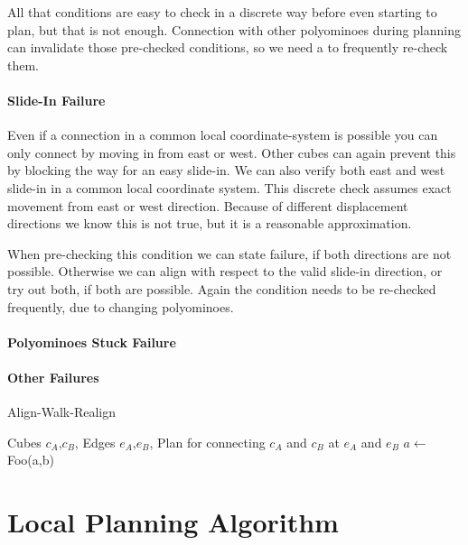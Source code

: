 All that conditions are easy to check in a discrete way before even starting to plan, but that is not enough.
Connection with other polyominoes during planning can invalidate those pre-checked conditions, so we need a to frequently re-check them.

\paragraph{Slide-In Failure}

Even if a connection in a common local coordinate-system is possible you can only connect by moving in from east or west.
Other cubes can again prevent this by blocking the way for an easy slide-in.
We can also verify both east and west slide-in in a common local coordinate system.
This discrete check assumes exact movement from east or west direction.
Because of different displacement directions we know this is not true, but it is a reasonable approximation.

When pre-checking this condition we can state failure, if both directions are not possible.
Otherwise we can align with respect to the valid slide-in direction, or try out both, if both are possible.
Again the condition needs to be re-checked frequently, due to changing polyominoes.

\paragraph{Polyominoes Stuck Failure}



\paragraph{Other Failures}


\begin{algorithm}
	\caption{Align-Walk-Realign}
	\label{alg:local_algo}
	\begin{algorithmic}
		\REQUIRE Cubes $c_A$,$c_B$, Edges $e_A$,$e_B$, 
		\ENSURE Plan for connecting $c_A$ and $c_B$ at $e_A$ and $e_B$
		\STATE $a \gets$ Foo(a,b)
	\end{algorithmic}
\end{algorithm}

\section{Local Planning Algorithm}
\label{sec:local_algo}